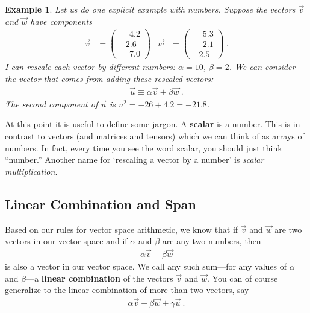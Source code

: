 \documentclass[12pt]{article}
\newtheorem{example}{Example}[section]
\begin{document}
\begin{example}
Let us do one explicit example with numbers. Suppose the vectors $\vec{v}$ and $\vec{w}$ have components
\begin{align}
    \vec{v} &=
    \begin{pmatrix}
    \phantom{+}4.2\\
    -2.6\\
    \phantom{+}7.0        
    \end{pmatrix}
    &
    \vec{w} &=
    \begin{pmatrix}
    \phantom{+}5.3\\
    \phantom{+}2.1\\
    -2.5        
    \end{pmatrix} \ .
\end{align}
I can rescale each vector by different numbers: $\alpha = 10$, $\beta = 2$. We can consider the vector that comes from adding these rescaled vectors:
\begin{align}
    \vec{u} \equiv \alpha \vec{v} + \beta \vec{w} \ .
\end{align}
The second component of $\vec{u}$ is $u^2 = -26 + 4.2 = -21.8$.
\end{example}

At this point it is useful to define some jargon. A \textbf{scalar} is a number. This is in contrast to vectors (and matrices and tensors) which we can think of as arrays of numbers. In fact, every time you see the word scalar, you should just think ``number.'' Another name for `rescaling a vector by a number' is \emph{scalar multiplication}.



\subsection{Linear Combination and Span}

Based on our rules for vector space arithmetic, we know that if $\vec{v}$ and $\vec{w}$ are two vectors in our vector space and if $\alpha$ and $\beta$ are any two numbers, then
\begin{align}
    \alpha\vec{v} + \beta\vec{w} 
\end{align}
is also a vector in our vector space. We call any such sum---for any values of $\alpha$ and $\beta$---a \textbf{linear combination} of the vectors $\vec{v}$ and $\vec{w}$. You can of course generalize to the linear combination of more than two vectors, say
\begin{align}
    \alpha\vec{v} + \beta\vec{w} + \gamma\vec{u} \ .
\end{align}
\end{document}

